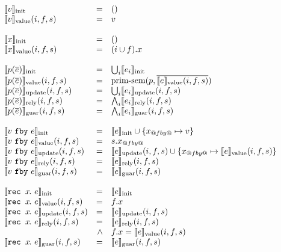 \begin{figure}
  \small
  \[
  \begin{array}{lrl}
    \sysinit{v} & = & () \\
    \sysvalue{v}(i, f, s) & = & v \\
    \\
    \sysinit{x} & = & () \\
    \sysvalue{x}(i, f, s) & = & (i \cup f).x \\
    \\
    \sysinit{p(\ov{e})} & = & \bigcup_i \sysinit{e_i} \\
    \sysvalue{p(\ov{e})}(i, f, s) & = & \text{prim-sem}(p, \ov{\sysvalue{e}(i, f, s)}) \\
    \sysupdate{p(\ov{e})}(i, f, s) & = & \bigcup_i \sysupdate{e_i}(i, f, s) \\
    \sysrely{p(\ov{e})}(i, f, s) & = & \bigwedge_i \sysrely{e_i}(i, f, s) \\
    \sysguar{p(\ov{e})}(i, f, s) & = & \bigwedge_i \sysguar{e_i}(i, f, s) \\
    \\
    \sysinit{\xfby{v}{e}} & = & \sysinit{e} \cup \{ x_{@fby@} \mapsto v \} \\
    \sysvalue{\xfby{v}{e}}(i, f, s) & = & s.x_{@fby@} \\
    \sysupdate{\xfby{v}{e}}(i, f, s) & = & \sysupdate{e}(i, f, s) \cup \{x_{@fby@} \mapsto \sysvalue{e}(i, f, s)\}\\
    \sysrely{\xfby{v}{e}}(i, f, s) & = & \sysrely{e}(i, f, s) \\
    \sysguar{\xfby{v}{e}}(i, f, s) & = & \sysguar{e}(i, f, s) \\
    \\
    \sysinit{\xrec{x}{e}} & = & \sysinit{e} \\
    \sysvalue{\xrec{x}{e}}(i, f, s) & = & f.x \\
    \sysupdate{\xrec{x}{e}}(i, f, s) & = & \sysupdate{e}(i, f, s)\\
    \sysrely{\xrec{x}{e}}(i, f, s) & = & \sysrely{e}(i, f, s) \\
          & \wedge & f.x = \sysvalue{e}(i, f, s) \\
    \sysguar{\xrec{x}{e}}(i, f, s) & = & \sysguar{e}(i, f, s) \\

\end{array}\]
\end{figure}
